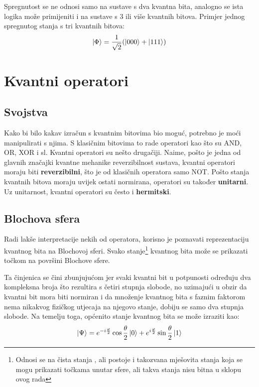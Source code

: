 Spregnutost se ne odnosi samo na sustave s dva kvantna bita, analogno se ista logika može primijeniti i na sustave s 3 ili više kvantnih bitova. Primjer jednog spregnutog stanja s tri kvantnih bitova:
\[
\ket{\Phi} = \frac{1}{\sqrt{2}}(\ket{000} + \ket{111})
\]




\section{Kvantni operatori}

\subsection{Svojstva}

Kako bi bilo kakav izračun s kvantnim bitovima bio moguć, potrebno je moći manipulirati s njima. S klasičnim bitovima to rade operatori kao što su AND, OR, XOR i sl. Kvantni operatori su nešto drugačiji. Naime, pošto je jedna od glavnih značajki kvantne mehanike reverzibilnost sustava, kvantni operatori moraju biti \textbf{reverzibilni}, što je od klasičnih operatora samo NOT. Pošto stanja kvantnih bitova moraju uvijek ostati normirana, operatori su također \textbf{unitarni}. Uz unitarnost, kvantni operatori su često i \textbf{hermitski}.

\subsection{Blochova sfera}

Radi lakše interpretacije nekih od operatora, korisno je poznavati reprezentaciju kvantnog bita na Blochovoj sferi. Svako stanje\footnote{Odnosi se na čista stanja , ali postoje i takozvana mješovita stanja koja se mogu prikazati točkama unutar sfere, ali takva stanja nisu bitna u sklopu ovog rada} kvantnog bita može se prikazati točkom na površini Blochove sfere.

Ta činjenica se čini zbunjujućom jer svaki kvantni bit u potpunosti određuju dva kompleksna broja što rezultira s četiri stupnja slobode, no uzimajući u obzir da kvantni bit mora biti normiran i da množenje kvantnog bita s faznim faktorom nema nikakvog fizičkog utjecaja na njegovo stanje, dobiju se samo dva stupnja slobode. Na temelju toga, općenito stanje kvantnog bita se može izraziti kao:
\[
\ket{\Psi} = e^{-i\frac{\varphi}{2}}\cos\frac{\theta}{2}\ket{0} + e^{i\frac{\varphi}{2}}\sin\frac{\theta}{2}\ket{1}
\]

